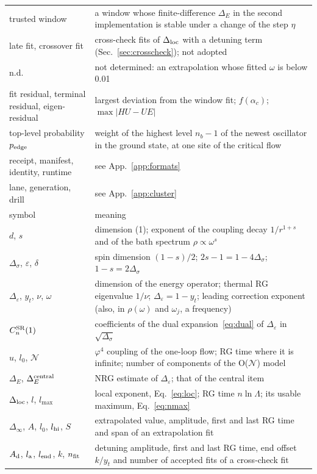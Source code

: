 \documentclass[10pt,a4paper]{article}
\newcommand{\Ds}{\Delta_\sigma}
\newcommand{\De}{\Delta_\varepsilon}
\newcommand{\DE}{\Delta_E}
\newcommand{\Dloc}{\Delta_{\rm loc}}
\begin{document}
\begin{longtable}{@{}>{\raggedright\arraybackslash}p{3.4cm}p{12.2cm}@{}}
trusted window & a window whose finite-difference $\DE$ in the second implementation is stable under a change of the step $\eta$\\
late fit, crossover fit & cross-check fits of $\Dloc$ with a detuning term (Sec.~\ref{sec:crosscheck}); not adopted\\
n.d. & not determined: an extrapolation whose fitted $\omega$ is below 0.01\\
fit residual, terminal residual, eigen-residual & largest deviation from the window fit; $f(\alpha_c)$; $\max|HU-UE|$\\
top-level probability $p_{\rm edge}$ & weight of the highest level $n_b-1$ of the newest oscillator in the ground state, at one site of the critical flow\\
receipt, manifest, identity, runtime & see App.~\ref{app:formats}\\
lane, generation, drill & see App.~\ref{app:cluster}\\
\midrule
symbol & meaning\\\midrule
$d$, $s$ & dimension (1); exponent of the coupling decay $1/r^{1+s}$ and of the bath spectrum $\rho\propto\omega^s$\\
$\Ds$, $\varepsilon$, $\delta$ & spin dimension $(1-s)/2$; $2s-1=1-4\Ds$; $1-s=2\Ds$\\
$\De$, $y_t$, $\nu$, $\omega$ & dimension of the energy operator; thermal RG eigenvalue $1/\nu$; $\De=1-y_t$; leading correction exponent (also, in $\rho(\omega)$ and $\omega_j$, a frequency)\\
$C^{\rm SR}_n(1)$ & coefficients of the dual expansion~\eqref{eq:dual} of $\De$ in $\sqrt{\Ds}$\\
$u$, $l_0$, $\mathcal N$ & $\varphi^4$ coupling of the one-loop flow; RG time where it is infinite; number of components of the O($\mathcal N$) model\\
$\DE$, $\DE^{\rm central}$ & NRG estimate of $\De$; that of the central item\\
$\Dloc$, $l$, $l_{\max}$ & local exponent, Eq.~\eqref{eq:loc}; RG time $n\ln\Lambda$; its usable maximum, Eq.~\eqref{eq:nmax}\\
$\Delta_\infty$, $A$, $l_0$, $l_{\rm hi}$, $S$ & extrapolated value, amplitude, first and last RG time and span of an extrapolation fit\\
$A_{\rm d}$, $l_{\rm a}$, $l_{\rm end}$, $k$, $n_{\rm fit}$ & detuning amplitude, first and last RG time, end offset $k/y_t$ and number of accepted fits of a cross-check fit\\

\end{longtable}
\end{document}
